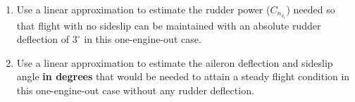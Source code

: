 \begin{question}
\begin{enumerate}[label=\alph*)]
    \item Use a linear approximation to estimate the rudder power ($C_{n_{\delta_r}}$) needed so that flight with no sideslip can be maintained with an absolute rudder deflection of $3^\circ$ in this one-engine-out case.

    \item Use a linear approximation to estimate the aileron deflection and sideslip angle \textbf{in degrees} that would be needed to attain a steady flight condition in this one-engine-out case without any rudder deflection.
    



    
\end{enumerate}
\end{question}
